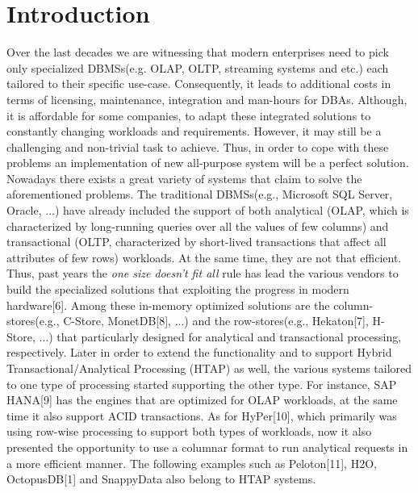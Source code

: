 \documentclass[10pt, conference, compsocconf]{IEEEtran}
\begin{document}
\section{Introduction}
Over the last decades we are witnessing that modern enterprises need to pick only  specialized DBMSs(e.g. OLAP, OLTP, streaming systems and etc.) each tailored to their specific use-case. Consequently, it leads to additional costs in terms of licensing, maintenance, integration and man-hours for DBAs. Although, it is affordable for some companies, to adapt these integrated solutions to constantly changing workloads and requirements. However, it may still be a challenging and non-trivial task to achieve. Thus, in order to cope with these problems an implementation of new all-purpose system will be a perfect solution. \\ Nowadays there exists a great variety of systems that claim to solve the aforementioned problems. The traditional DBMSs(e.g., Microsoft SQL Server, Oracle, ...) have already included the support of both analytical (OLAP, which is characterized by long-running queries over all the values of few columns) and transactional (OLTP, characterized by short-lived transactions that affect all attributes of few rows) workloads. At the same time, they are not that efficient. Thus, past years the \textit{one size doesn't fit all} rule has lead the various vendors to build the specialized solutions that exploiting the progress in modern hardware[6]. Among these in-memory optimized solutions are the column-stores(e.g., C-Store, MonetDB[8], ...) and the row-stores(e.g., Hekaton[7], H-Store, ...) that particularly designed for analytical and transactional processing, respectively. Later in order to extend the functionality and to support Hybrid Transactional/Analytical Processing (HTAP) as well, the various systems tailored to one type of processing started supporting the other type. For instance, SAP HANA[9] has the engines that are optimized for OLAP workloads, at the same time it also support ACID transactions. As for HyPer[10], which primarily was using row-wise processing to support both types of workloads, now it also presented the opportunity to use a columnar format to run analytical requests in a more efficient manner. The following examples such as Peloton[11], H2O, OctopusDB[1] and  SnappyData also belong to HTAP systems.  
\end{document}

